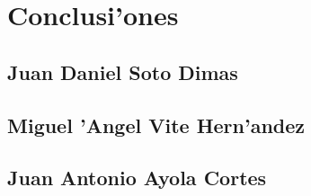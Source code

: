 \chapter{Conclusi'ones}
\section{Juan Daniel Soto Dimas}

\section{Miguel 'Angel Vite Hern'andez}

\section{Juan Antonio Ayola Cortes}
